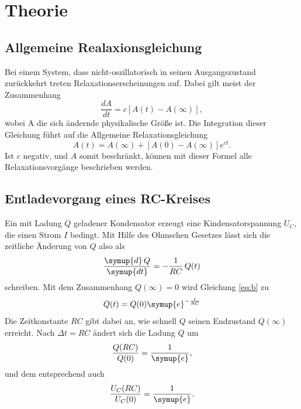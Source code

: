 \section{Theorie}
\label{sec:Theorie}
\subsection{Allgemeine Realaxionsgleichung}
Bei einem System, dass nicht-oszillatorisch in seinen
Ausgangszustand zurückkehrt treten Relaxationserscheinungen
auf. Dabei gilt meist der Zusammenhang
\begin{equation}
    \frac{dA}{dt}=c[A(t)-A(\infty)],
\end{equation}
\noindent wobei A die sich ändernde physikalische Größe ist.
Die Integration dieser Gleichung führt auf die Allgemeine
Relaxationsgleichung
\begin{equation}
    A(t)=A(\infty)+[A(0)-A(\infty)]e^{ct}.
    \label{eq:b}
\end{equation}
\noindent Ist $c$ negativ, und $A$ somit beschränkt,
können mit dieser Formel alle Relaxationsvorgänge beschrieben werden.
\subsection{Entladevorgang eines RC-Kreises}
Ein mit Ladung $Q$ geladener Kondensator erzeugt eine
Kindensatorspannung $U_C$, die einen Strom $I$ bedingt.
Mit Hilfe des Ohmschen Gesetzes lässt sich die
zeitliche Änderung von $Q$ also als
\begin{equation}
    \frac{{\symup{d}\,Q}}{\symup{dt}}=-\frac{1}{RC}\,Q(t)
\end{equation}
schreiben. Mit dem Zusammenhang $Q(\infty) =0$ wird
Gleichung \ref{eq:b} zu
\begin{equation}
    Q(t)=Q(0)\symup{e}^{-\frac{t}{RC}}
\end{equation}
\noindent Die Zeitkonstante $RC$ gibt dabei an, wie
schnell $Q$ seinen Endzustand $Q(\infty)$ erreicht.
Nach $\Delta t=RC$ ändert sich die Ladung $Q$ um
\begin{equation}
    \frac{Q(RC)}{Q(0)}=\frac{1}{\symup{e}},
\end{equation}
\noindent und dem entsprechend auch
\begin{equation}
    \frac{U_C(RC)}{U_C(0)}=\frac{1}{\symup{e}}.
\end{equation}
